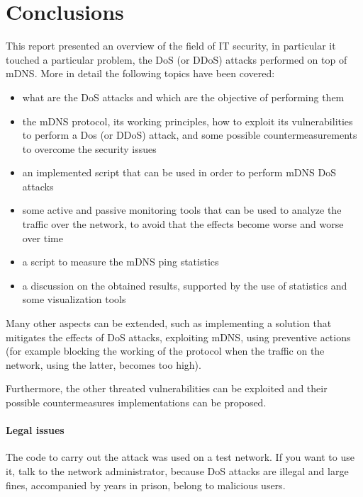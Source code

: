 \documentclass[fleqn, 11pt]{SelfArx} %
\begin{document}
\vfill\null
\section{Conclusions}
This report presented an overview of the field of IT security, in particular it touched a particular problem, the DoS (or DDoS) attacks performed on top of mDNS.
More in detail the following topics have been covered:
\begin{itemize}[leftmargin=*]
	\item what are the DoS attacks and which are the objective of performing them 
	\item the mDNS protocol, its working principles, how to exploit its vulnerabilities to perform a Dos (or DDoS) attack, and some possible 
		  countermeasurements to overcome the security issues
 	\item an implemented script that can be used in order to perform mDNS DoS attacks
	\item some active and passive monitoring tools that can be used to analyze the traffic over the network,
	      to avoid that the effects become worse and worse over time
	\item a script to measure the mDNS ping statistics
 	\item a discussion on the obtained results, supported by the use of statistics and some visualization tools
\end{itemize}

Many other aspects can be extended, such as implementing a solution that mitigates the effects of DoS attacks, exploiting mDNS, using preventive actions 
(for example blocking the working of the protocol when the traffic on the network, using the latter, becomes too high).

Furthermore, the other threated vulnerabilities can be exploited and their possible countermeasures implementations can be proposed.

\paragraph{Legal issues \cite{IllegalIssues}} The code to carry out the attack was used on a test network. If you want to use it, talk to the network administrator, because DoS attacks are illegal and
						large fines, accompanied by years in prison, belong to malicious users.


\clearpage
{}



\end{document}
